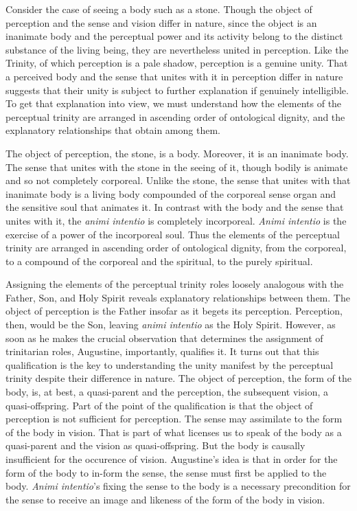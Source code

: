 \documentclass[12pt]{article}
\begin{document}
Consider the case of seeing a body such as a stone. Though the object of perception and the sense and vision differ in nature, since the object is an inanimate body and the perceptual power and its activity belong to the distinct substance of the living being, they are nevertheless united in perception. Like the Trinity, of which perception is a pale shadow, perception is a genuine unity. That a perceived body and the sense that unites with it in perception differ in nature suggests that their unity is subject to further explanation if genuinely intelligible. To get that explanation into view, we must understand how the elements of the perceptual trinity are arranged in ascending order of ontological dignity, and the explanatory relationships that obtain among them.

The object of perception, the stone, is a body. Moreover, it is an inanimate body. The sense that unites with the stone in the seeing of it, though bodily is animate and so not completely corporeal. Unlike the stone, the sense that unites with that inanimate body is a living body compounded of the corporeal sense organ and the sensitive soul that animates it. In contrast with the body and the sense that unites with it, the \emph{animi intentio} is completely incorporeal. \emph{Animi intentio} is the exercise of a power of the incorporeal soul. Thus the elements of the perceptual trinity are arranged in ascending order of ontological dignity, from the corporeal, to a compound of the corporeal and the spiritual, to the purely spiritual.

Assigning the elements of the perceptual trinity roles loosely analogous with the Father, Son, and Holy Spirit reveals explanatory relationships between them. The object of perception is the Father insofar as it begets its perception. Perception, then, would be the Son, leaving \emph{animi intentio} as the Holy Spirit. However, as soon as he makes the crucial observation that determines the assignment of trinitarian roles, Augustine, importantly, qualifies it. It turns out that this qualification is the key to understanding the unity manifest by the perceptual trinity despite their difference in nature. The object of perception, the form of the body, is, at best, a quasi-parent and the perception, the subsequent vision, a quasi-offspring. Part of the point of the qualification is that the object of perception is not sufficient for perception. The sense may assimilate to the form of the body in vision. That is part of what licenses us to speak of the body as a quasi-parent and the vision as quasi-offspring. But the body is causally insufficient for the occurence of vision. Augustine's idea is that in order for the form of the body to in-form the sense, the sense must first be applied to the body. \emph{Animi intentio}'s fixing the sense to the body is a necessary precondition for the sense to receive an image and likeness of the form of the body in vision. 
\end{document}
